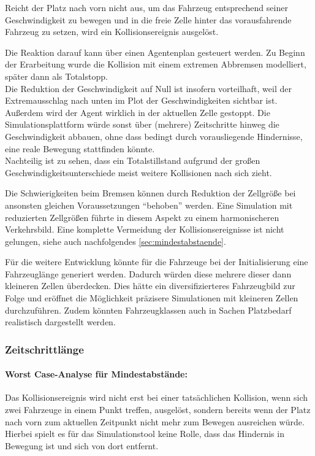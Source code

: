 Reicht der Platz nach vorn nicht aus, um das Fahrzeug entsprechend seiner Geschwindigkeit zu bewegen und in die freie Zelle hinter das vorausfahrende Fahrzeug zu setzen, wird ein Kollisionsereignis ausgelöst.

Die Reaktion darauf kann über einen Agentenplan gesteuert werden.
Zu Beginn der Erarbeitung wurde die Kollision mit einem extremen Abbremsen modelliert, später dann als Totalstopp.
\\
Die Reduktion der Geschwindigkeit auf Null ist insofern vorteilhaft, weil der Extremausschlag nach unten im Plot der Geschwindigkeiten sichtbar ist.
Außerdem wird der Agent wirklich in der aktuellen Zelle gestoppt. 
Die Simulationsplattform würde sonst über (mehrere) Zeitschritte hinweg die Geschwindigkeit abbauen, ohne dass bedingt durch vorausliegende Hindernisse, eine reale Bewegung stattfinden könnte. 
\\
Nachteilig ist zu sehen, dass ein Totalstillstand aufgrund der großen Geschwindigkeitsunterschiede meist weitere Kollisionen nach sich zieht.

Die Schwierigkeiten beim Bremsen können durch Reduktion der Zellgröße bei ansonsten gleichen Voraussetzungen \enquote{behoben} werden.
Eine Simulation mit reduzierten Zellgrößen führte in diesem Aspekt zu einem harmonischeren Verkehrsbild.
Eine komplette Vermeidung der Kollisionsereignisse ist nicht gelungen, siehe auch nachfolgendes \cref{sec:mindestabstaende}.

Für die weitere Entwicklung könnte für die Fahrzeuge bei der Initialisierung eine Fahrzeuglänge generiert werden.
Dadurch würden diese mehrere dieser dann kleineren Zellen überdecken.
Dies hätte ein diversifizierteres Fahrzeugbild zur Folge und eröffnet die Möglichkeit präzisere Simulationen mit kleineren Zellen durchzuführen.
Zudem könnten Fahrzeugklassen auch in Sachen Platzbedarf realistisch dargestellt werden.


\subsubsection{Zeitschrittlänge}

\paragraph*{Worst Case-Analyse für Mindestabstände:}
\label{sec:mindestabstaende}

Das Kollisionsereignis wird nicht erst bei einer tatsächlichen Kollision, wenn sich zwei Fahrzeuge in einem Punkt treffen, ausgelöst, sondern bereits wenn der Platz nach vorn zum aktuellen Zeitpunkt nicht mehr zum Bewegen ausreichen würde.
Hierbei spielt es für das Simulationstool keine Rolle, dass das Hindernis in Bewegung ist und sich von dort entfernt.

